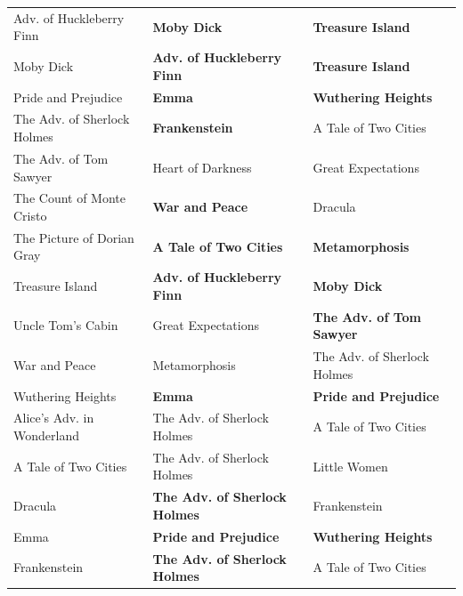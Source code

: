 \documentclass[11pt]{article}
\begin{document}
\begin{table}
\begin{tabular}{lll}
		Adv. of Huckleberry Finn &                           \textbf{Moby Dick} &                     \textbf{Treasure Island} \\
		Moby Dick &      \textbf{Adv. of Huckleberry Finn} &                     \textbf{Treasure Island} \\
		Pride and Prejudice &                                \textbf{Emma} &                  \textbf{Wuthering Heights} \\
		The Adv. of Sherlock Holmes &                        \textbf{Frankenstein} &                A Tale of Two Cities \\
		The Adv. of Tom Sawyer &                   Heart of Darkness &                  Great Expectations \\
		The Count of Monte Cristo &                       \textbf{War and Peace} &                             Dracula \\
		The Picture of Dorian Gray &                \textbf{A Tale of Two Cities} &                       \textbf{Metamorphosis} \\
		Treasure Island &      \textbf{Adv. of Huckleberry Finn} &                           \textbf{Moby Dick} \\
		Uncle Tom's Cabin &                  Great Expectations &        \textbf{The Adv. of Tom Sawyer} \\
		War and Peace &                       Metamorphosis &   The Adv. of Sherlock Holmes \\
		Wuthering Heights &                                \textbf{Emma} &                 \textbf{Pride and Prejudice} \\
		Alice's Adv. in Wonderland &   The Adv. of Sherlock Holmes &                A Tale of Two Cities \\
		A Tale of Two Cities &   The Adv. of Sherlock Holmes &                        Little Women \\
		Dracula &   \textbf{The Adv. of Sherlock Holmes} &                        Frankenstein \\
		Emma &                 \textbf{Pride and Prejudice} &                   \textbf{Wuthering Heights} \\
		Frankenstein &   \textbf{The Adv. of Sherlock Holmes} &                A Tale of Two Cities \\

\end{tabular}
\end{table}
\end{document}
